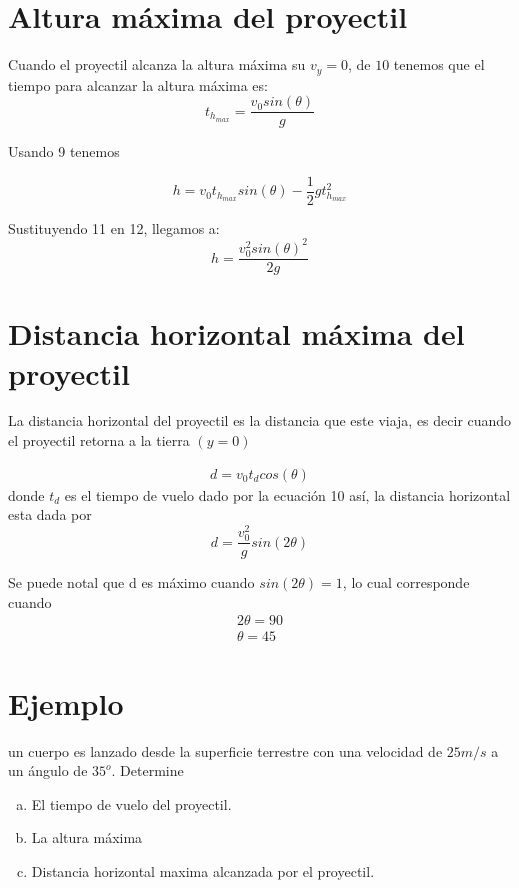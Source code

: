 \documentclass[12pt,a4paper]{article}
\begin{document}
\section{ Altura máxima del proyectil}
Cuando el proyectil alcanza la altura máxima su $v_{y} =0$, de $10$ tenemos que el tiempo para alcanzar la altura máxima es:
\begin{equation}
t_{h_{max}} = \frac{v_{0}sin (\theta)}{g}
\end{equation}

Usando 9 tenemos

\begin{equation}
h=v_{0} t_{h_{max}}sin(\theta)-\frac{1}{2}gt_{h_{max}}^2
\end{equation}
 
Sustituyendo 11 en 12, llegamos a:
\begin{equation}
h=\frac{v_{0}^2 sin(\theta)^2}{2g}   
\end{equation}

\section{ Distancia horizontal máxima del proyectil}
La distancia horizontal del proyectil es la distancia que este viaja, es decir cuando el proyectil retorna a la tierra $(y=0)$

\begin{eqnarray}
d = v_0 t_d cos(\theta)
\end{eqnarray}
donde $t_d$ es el tiempo de vuelo dado por la ecuación 10
así, la distancia horizontal esta dada por 
\begin{equation}
d = \frac{v_0^2}{g}sin(2\theta)
\end{equation}

Se puede notal que d es máximo cuando $ sin(2\theta)= 1$, lo cual corresponde cuando
\begin{eqnarray}
2\theta =90 \nonumber\\
\theta = 45 \nonumber
\end{eqnarray}

\section{Ejemplo}

un cuerpo es lanzado desde la superficie terrestre con una velocidad de $25 m/s $ a un ángulo de $35^{o}$. Determine
\begin{enumerate}[a)]

\item El tiempo de vuelo del proyectil. 
\item La altura máxima 
\item Distancia horizontal maxima alcanzada por el proyectil.
\end{enumerate}
\end{document}
